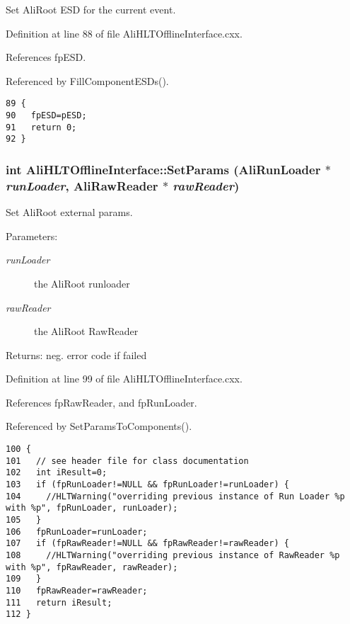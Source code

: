 Set Ali\-Root ESD for the current event. 

Definition at line 88 of file Ali\-HLTOffline\-Interface.cxx.

References fp\-ESD.

Referenced by Fill\-Component\-ESDs().

\footnotesize\begin{verbatim}89 {
90   fpESD=pESD;
91   return 0;
92 }
\end{verbatim}\normalsize 


\subsubsection{\setlength{\rightskip}{0pt plus 5cm}int Ali\-HLTOffline\-Interface::Set\-Params (Ali\-Run\-Loader $\ast$ {\em run\-Loader}, Ali\-Raw\-Reader $\ast$ {\em raw\-Reader})}\label{classAliHLTOfflineInterface_a9}


Set Ali\-Root external params.

\begin{Desc}
\item[Parameters:]
\begin{description}
\item[{\em run\-Loader}]the Ali\-Root runloader \item[{\em raw\-Reader}]the Ali\-Root Raw\-Reader \end{description}
\end{Desc}
\begin{Desc}
\item[Returns:]neg. error code if failed \end{Desc}


Definition at line 99 of file Ali\-HLTOffline\-Interface.cxx.

References fp\-Raw\-Reader, and fp\-Run\-Loader.

Referenced by Set\-Params\-To\-Components().

\footnotesize\begin{verbatim}100 {
101   // see header file for class documentation
102   int iResult=0;
103   if (fpRunLoader!=NULL && fpRunLoader!=runLoader) {
104     //HLTWarning("overriding previous instance of Run Loader %p with %p", fpRunLoader, runLoader);
105   }
106   fpRunLoader=runLoader;
107   if (fpRawReader!=NULL && fpRawReader!=rawReader) {
108     //HLTWarning("overriding previous instance of RawReader %p with %p", fpRawReader, rawReader);
109   }
110   fpRawReader=rawReader;
111   return iResult;
112 }
\end{verbatim}\normalsize 


